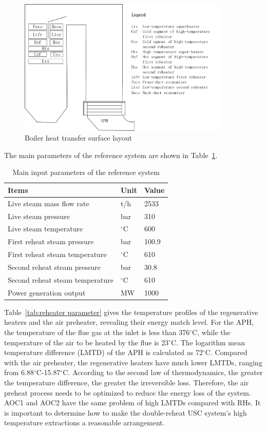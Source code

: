 \documentclass[preprint,12pt]{elsarticle}
\begin{document}
\begin{figure}[htbp]
\centering
\includegraphics[width=0.9\textwidth]{fig/boiler_surface.png}
\caption{Boiler heat transfer surface layout} 
\label{fig:boiler_surface}
\end{figure}


The main parameters of the reference system are shown in Table~\ref{tab:ref input}.

\begin{table}[htbp]
\caption{Main input parameters of the reference system }
\label{tab:ref input}
\centering
\begin{tabular}{lll}
\toprule 
Items & Unit & Value\tabularnewline
\midrule
 Live steam mass flow rate 	    	&t/h 			&2533 \\
 Live steam pressure 		    	&bar 			&310\\
 Live steam temperature		     	&$^\circ$C		&600		\\
 First reheat steam pressure    	&bar			&100.9		\\
 First reheat steam temperature  	&$^\circ$C		&610		\\
 Second reheat steam pressure    	&bar			&30.8		\\
 Second reheat steam temperature 	&$^\circ$C		&610		\\
 Power generation output 			&MW				&1000		\\
\bottomrule
\end{tabular}	
\end{table}

Table~\ref{tab:reheater parameter} gives the temperature profiles of the regenerative heaters and the air preheater, revealing their energy match level.
For the APH, the temperature of the flue gas at the inlet is less than 376$^\circ$C,  
 while the temperature of the air to be heated by the flue is 23$^\circ$C.
The logarithm mean temperature difference (LMTD) of the APH is calculated as 72$^\circ$C.
Compared with the air preheater, the regenerative heaters have much lower LMTDs, ranging from 6.88$^\circ$C-15.87$^\circ$C.
According to the second law of thermodynamics, the greater the temperature difference, the greater the irreversible loss.
Therefore, the air preheat process needs to be optimized to reduce the energy loss of the system.
AOC1 and AOC2 have the same problem of high LMTDs compared with RHs.
It is important to determine how to make the double-reheat USC system's high temperature extractions a reasonable arrangement. 
\end{document}
